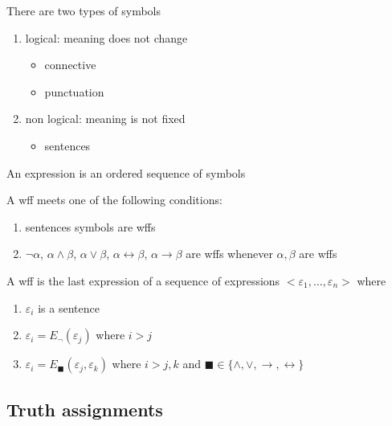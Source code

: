 \documentclass[../main.tex]{subfiles}
\begin{document}
\begin{definition}[Symbols]
    There are two types of symbols
    \begin{enumerate}
        \item logical: meaning does not change
        \begin{itemize}
            \item connective
            \item punctuation
        \end{itemize}
        \item non logical: meaning is not fixed
        \begin{itemize}
            \item sentences
        \end{itemize}
    \end{enumerate}
\end{definition}
\begin{definition}[Expression]
    An expression is an ordered sequence of symbols
\end{definition}
\begin{definition}
    A wff meets one of the following conditions:
    \begin{enumerate}
        \item sentences symbols are wffs
        \item $\neg\alpha$, $\alpha\wedge\beta$, $\alpha\vee\beta$, $\alpha\leftrightarrow\beta$, $\alpha\rightarrow\beta$ are wffs whenever $\alpha, \beta$ are wffs
    \end{enumerate}
\end{definition}
\begin{definition}
    A wff is the last expression of a sequence of expressions $<\varepsilon_1,\dots,\varepsilon_n>$ where
    \begin{enumerate}
        \item $\varepsilon_i$ is a sentence
        \item $\varepsilon_i = E_\neg(\varepsilon_j)$ where $i>j$
        \item $\varepsilon_i = E_\blacksquare(\varepsilon_j, \varepsilon_k)$ where $i>j,k$ and $\blacksquare\in \{ \wedge, \vee, \rightarrow, \leftrightarrow \}$
    \end{enumerate}
\end{definition}


\subsection{Truth assignments}
\end{document}
